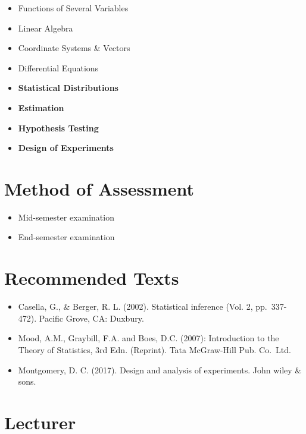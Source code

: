 \documentclass[]{book}
\providecommand{\tightlist}{%
  \setlength{\itemsep}{0pt}\setlength{\parskip}{0pt}}
\begin{document}
\begin{itemize}
\tightlist
\item
  Functions of Several Variables
\item
  Linear Algebra
\item
  Coordinate Systems \& Vectors
\item
  Differential Equations
\item
  \textbf{Statistical Distributions}
\item
  \textbf{Estimation}
\item
  \textbf{Hypothesis Testing}
\item
  \textbf{Design of Experiments}
\end{itemize}

\hypertarget{method-of-assessment}{%
\section*{Method of Assessment}\label{method-of-assessment}}

\begin{itemize}
\tightlist
\item
  Mid-semester examination
\item
  End-semester examination
\end{itemize}

\hypertarget{recommended-texts}{%
\section*{Recommended Texts}\label{recommended-texts}}

\begin{itemize}
\tightlist
\item
  Casella, G., \& Berger, R. L. (2002). Statistical inference (Vol. 2, pp.~337-472). Pacific Grove, CA: Duxbury.
\item
  Mood, A.M., Graybill, F.A. and Boes, D.C. (2007): Introduction to the Theory of Statistics, 3rd Edn.
  (Reprint). Tata McGraw-Hill Pub. Co.~Ltd.~
\item
  Montgomery, D. C. (2017). Design and analysis of experiments. John wiley \& sons.
\end{itemize}

\hypertarget{lecturer}{%
\section*{Lecturer}\label{lecturer}}
\end{document}
